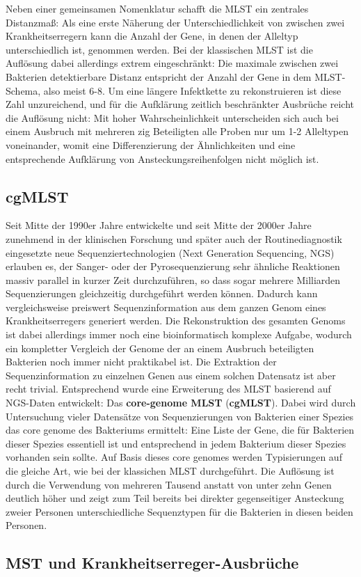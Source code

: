 Neben einer gemeinsamen Nomenklatur schafft die MLST ein zentrales Distanzmaß: Als eine erste Näherung der Unterschiedlichkeit von zwischen zwei Krankheitserregern kann die Anzahl der Gene, in denen der Alleltyp unterschiedlich ist, genommen werden. Bei der klassischen MLST ist die Auflösung dabei allerdings extrem eingeschränkt: Die maximale zwischen zwei Bakterien detektierbare Distanz entspricht der Anzahl der Gene in dem MLST-Schema, also meist 6-8. Um eine längere Infektkette zu rekonstruieren ist diese Zahl unzureichend, und für die Aufklärung zeitlich beschränkter Ausbrüche reicht die Auflösung nicht: Mit hoher Wahrscheinlichkeit unterscheiden sich auch bei einem Ausbruch mit mehreren zig Beteiligten alle Proben nur um 1-2 Alleltypen voneinander, womit eine Differenzierung der Ähnlichkeiten und eine entsprechende Aufklärung von Ansteckungsreihenfolgen nicht möglich ist.  

\subsection{cgMLST}

Seit Mitte der 1990er Jahre entwickelte und seit Mitte der 2000er Jahre zunehmend in der klinischen Forschung und später auch der Routinediagnostik eingesetzte neue Sequenziertechnologien (Next Generation Sequencing, NGS) erlauben es, der Sanger- oder der Pyrosequenzierung sehr ähnliche Reaktionen massiv parallel in kurzer Zeit durchzuführen, so dass sogar mehrere Milliarden Sequenzierungen gleichzeitig durchgeführt werden können. Dadurch kann vergleichsweise preiswert Sequenzinformation aus dem ganzen Genom eines Krankheitserregers generiert werden. Die Rekonstruktion des gesamten Genoms ist dabei allerdings immer noch eine bioinformatisch komplexe Aufgabe, wodurch ein kompletter Vergleich der Genome der an einem Ausbruch beteiligten Bakterien noch immer nicht praktikabel ist. Die Extraktion der Sequenzinformation zu einzelnen Genen aus einem solchen Datensatz ist aber recht trivial. Entsprechend wurde eine Erweiterung des MLST basierend auf NGS-Daten entwickelt: Das \textbf{core-genome MLST} (\textbf{cgMLST}). Dabei wird durch Untersuchung vieler Datensätze von Sequenzierungen von Bakterien einer Spezies das core genome des Bakteriums ermittelt: Eine Liste der Gene, die für Bakterien dieser Spezies essentiell ist und entsprechend in jedem Bakterium dieser Spezies vorhanden sein sollte. Auf Basis dieses core genomes werden Typisierungen auf die gleiche Art, wie bei der klassichen MLST durchgeführt. Die Auflösung ist durch die Verwendung von mehreren Tausend anstatt von unter zehn Genen deutlich höher und zeigt zum Teil bereits bei direkter gegenseitiger Ansteckung zweier Personen unterschiedliche Sequenztypen für die Bakterien in diesen beiden Personen.

\subsection{MST und Krankheitserreger-Ausbrüche}


